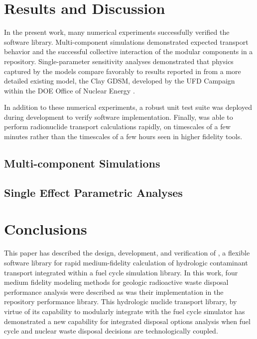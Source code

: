 \section{Results and Discussion}
\label{sec:results}

In the present work, many numerical experiments successfully verified the \Cyder software library.
Multi-component simulations demonstrated expected transport behavior and
the successful collective interaction of the modular
components in a \Cyder repository. Single-parameter sensitivity analyses
demonstrated that physics captured by the \Cyder models compare favorably to
results reported in \cite{huff_key_2012} from a more detailed existing model,
the Clay \gls{GDSM}, developed by the \gls{UFD} Campaign within the
\gls{DOE} Office of Nuclear Energy \cite{clayton_generic_2011}.

In addition to these numerical experiments, a robust unit test suite was
deployed during development to verify \Cyder software implementation.
Finally, \Cyder was able to perform radionuclide transport calculations
rapidly, on timescales of a few minutes rather than the timescales of a few
hours seen in higher fidelity tools.

\subsection{Multi-component Simulations}




\subsection{Single Effect Parametric Analyses}


\section{Conclusions}

This paper has described the design, development, and verification of \Cyder, a
flexible software library for rapid medium-fidelity calculation of hydrologic
contaminant transport integrated within a fuel cycle simulation library.
In this work, four medium fidelity modeling methods for geologic radioactive waste disposal
performance analysis were described as was their implementation in the \Cyder
repository performance library.  This hydrologic
nuclide transport library, by virtue of its capability to modularly integrate
with the \Cyclus fuel cycle simulator has demonstrated a new capability for
integrated disposal options analysis when fuel cycle and nuclear waste
disposal decisions are technologically coupled. 

